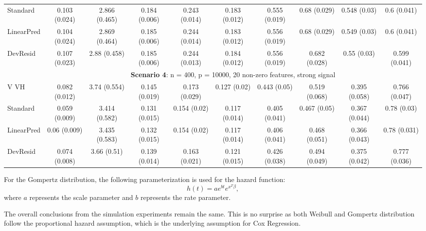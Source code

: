 \documentclass{article}
\begin{document}
\begin{landscape}
\begin{table}[ht]
\begin{tabular}[t]{lccccccccc}
Standard  & 0.103 (0.024) & 2.866 (0.465) & 0.184 (0.006) & 0.243 (0.014) & 0.183 (0.012) & 0.555 (0.019) & 0.68 (0.029) & 0.548 (0.03) & 0.6 (0.041) \\ 
LinearPred  & 0.104 (0.024) & 2.869 (0.464) & 0.185 (0.006) & 0.244 (0.014) & 0.183 (0.012) & 0.556 (0.019) & 0.68 (0.029) & 0.549 (0.03) & 0.6 (0.041) \\   
 DevResid  & 0.107 (0.023) & 2.88 (0.458) & 0.185 (0.006) & 0.244 (0.013) & 0.184 (0.012) & 0.556 (0.019) & 0.682 (0.028) & 0.55 (0.03) & 0.599 (0.041) \\
\addlinespace
&\multicolumn{9}{c}{\textbf{Scenario 4}: n = 400, p = 10000, 20 non-zero features, strong signal}\\
\cline{2-10}
 V VH  & 0.082 (0.012) & 3.74 (0.554) & 0.145 (0.019) & 0.173 (0.029) & 0.127 (0.02) & 0.443 (0.05) & 0.519 (0.068) & 0.395 (0.058) & 0.766 (0.047) \\  
Standard  & 0.059 (0.009) & 3.414 (0.582) & 0.131 (0.015) & 0.154 (0.02) & 0.117 (0.014) & 0.405 (0.041) & 0.467 (0.05) & 0.367 (0.044) & 0.78 (0.03) \\   
LinearPred  & 0.06 (0.009) & 3.435 (0.583) & 0.132 (0.015) & 0.154 (0.02) & 0.117 (0.014) & 0.406 (0.041) & 0.468 (0.051) & 0.366 (0.043) & 0.78 (0.031) \\   
 DevResid  & 0.074 (0.008) & 3.66 (0.51) & 0.139 (0.014) & 0.163 (0.021) & 0.121 (0.015) & 0.426 (0.038) & 0.494 (0.049) & 0.375 (0.042) & 0.777 (0.036) \\
\bottomrule
\end{tabular}
\end{table}

For the Gompertz distribution, the following parameterization is used for the hazard function:
$$h(t) = a e^{b t}e^{x^{T}\beta}, $$
where $a$ represents the scale parameter and $b$ represents the rate parameter. 

The overall conclusions from the simulation experiments remain the same. This is no surprise as both Weibull and Gompertz distribution follow the proportional hazard assumption, which is the underlying assumption for Cox Regression.

\begin{table}[ht]

\setlength{\tabcolsep}{3pt}


\end{table}
\end{landscape}
\end{document}
